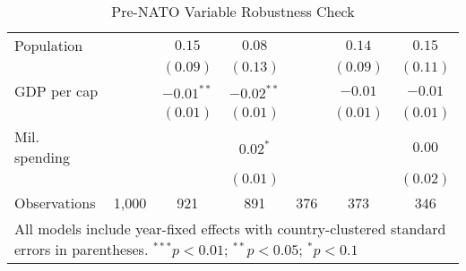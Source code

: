 \begin{table}[h]
\begin{center}
\begin{tabular}{l c c c c c c}
\quad Population      &               & $0.15$        & $0.08$        &               & $0.14$        & $0.15$        \\
                      &               & $(0.09)$      & $(0.13)$      &               & $(0.09)$      & $(0.11)$      \\
\quad GDP per cap     &               & $-0.01^{**}$  & $-0.02^{**}$  &               & $-0.01$       & $-0.01$       \\
                      &               & $(0.01)$      & $(0.01)$      &               & $(0.01)$      & $(0.01)$      \\
\quad Mil. spending   &               &               & $0.02^{*}$    &               &               & $0.00$        \\
                      &               &               & $(0.01)$      &               &               & $(0.02)$      \\
\hline
Observations          & 1,000         & 921           & 891           & 376           & 373           & 346           \\
\hline
\multicolumn{7}{l}{\scriptsize{All models include year-fixed effects with country-clustered standard errors in parentheses. $^{***}p<0.01$; $^{**}p<0.05$; $^{*}p<0.1$}}
\end{tabular}
\caption{Pre-NATO Variable Robustness Check}
\label{table:prenato-results}
\end{center}
\end{table}
